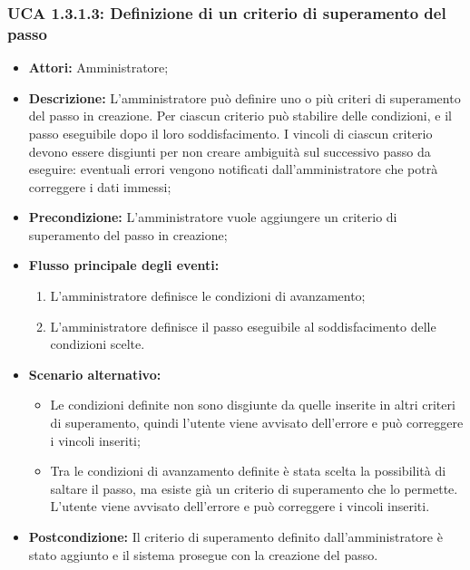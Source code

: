 \subsubsection{UCA 1.3.1.3: Definizione di un criterio di superamento del passo}
\begin{itemize}
\item \textbf{Attori:}
 Amministratore;
\item \textbf{Descrizione:}
 L'amministratore può definire uno o più criteri di superamento del passo in creazione.
Per ciascun criterio può stabilire delle condizioni, e il passo eseguibile dopo il loro soddisfacimento.
I vincoli di ciascun criterio devono essere disgiunti per non creare ambiguità sul successivo passo da eseguire: eventuali errori vengono notificati dall'amministratore che potrà correggere i dati immessi; 
\item \textbf{Precondizione:} 
L'amministratore vuole aggiungere un criterio di superamento del passo in creazione;
\item \textbf{Flusso principale degli eventi:} 
\begin{enumerate}
\item L'amministratore definisce le condizioni di avanzamento;
\item L'amministratore definisce il passo eseguibile al soddisfacimento delle condizioni scelte.
\end{enumerate}
\item \textbf{Scenario alternativo:}
\begin{itemize}
\item Le condizioni definite non sono disgiunte da quelle inserite in altri criteri di superamento, quindi l'utente viene avvisato dell'errore e può correggere i vincoli inseriti;
\item Tra le condizioni di avanzamento definite è stata scelta la possibilità di saltare il passo, ma esiste già un criterio di superamento che lo permette. L'utente viene avvisato dell'errore e può correggere i vincoli inseriti.
\end{itemize}
\item \textbf{Postcondizione:} 
Il criterio di superamento definito dall'amministratore è stato aggiunto e il sistema prosegue con la creazione del passo.
\end{itemize}

\hypertarget{A1.3.1.3.1}{}
